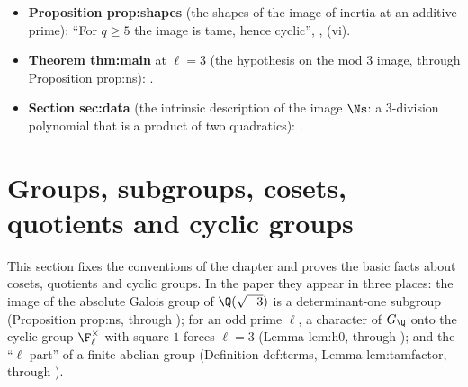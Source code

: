 \begin{itemize}
; for Lemma lem:tamagawa-exp ($\rho\bmod\ell^t$): .
\item \textbf{Proposition prop:shapes} (the shapes of the image of inertia at an additive prime): ``For $q\ge5$ the image is tame, hence cyclic'',
, (vi).
\item \textbf{Theorem thm:main} at $\ell=3$ (the hypothesis on the mod $3$ image, through Proposition prop:ns): .
\item \textbf{Section sec:data} (the intrinsic description of the image $\Ns$: a $3$-division polynomial that is a product of two quadratics): .
\end{itemize}

\section{Groups, subgroups, cosets, quotients and cyclic groups}\label{sec:groups:basics}

This section fixes the conventions of the chapter and proves the basic facts about cosets, quotients
and cyclic groups. In the paper they appear in three places: the image of the absolute Galois group of
$\Q(\sqrt{-3})$ is a determinant-one subgroup (Proposition prop:ns, through ); for an odd prime $\ell$, a character
of $G_\Q$ onto the cyclic group $\F_\ell^\times$ with square $1$ forces $\ell=3$ (Lemma lem:h0, through
); and the ``$\ell$-part'' of a finite abelian group (Definition def:terms, Lemma lem:tamfactor,
through ).

